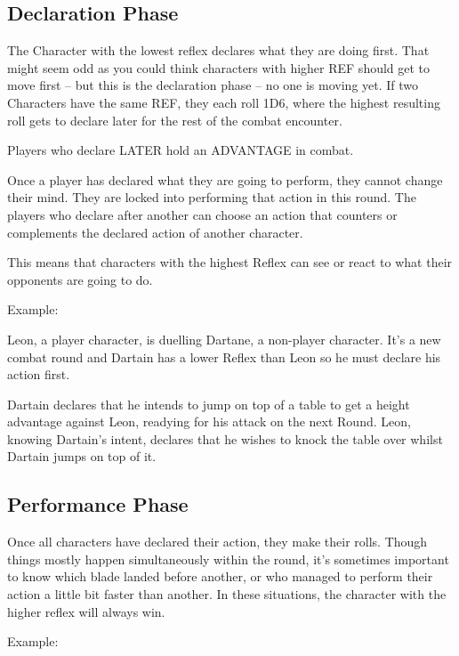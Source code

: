 \subsection{Declaration Phase} \label{subsec:declaration_phase}

The Character with the lowest reflex declares what they are doing first. That might seem odd as you could think characters with higher REF should get to move first – but this is the declaration phase – no one is moving yet. If two Characters have the same REF, they each roll 1D6, where the highest resulting roll gets to declare later for the rest of the combat encounter.

Players who declare LATER hold an ADVANTAGE in combat.

Once a player has declared what they are going to perform, they cannot change their mind. They are locked into performing that action in this round. The players who declare after another can choose an action that counters or complements the declared action of another character.

This means that characters with the highest Reflex can see or react to what their opponents are going to do.

Example:

\begin{displayquote}
    Leon, a player character, is duelling Dartane, a non-player character. It's a new combat round and Dartain has a lower Reflex than Leon so he must declare his action first.

    Dartain declares that he intends to jump on top of a table to get a height advantage against Leon, readying for his attack on the next Round. Leon, knowing Dartain's intent, declares that he wishes to knock the table over whilst Dartain jumps on top of it.
\end{displayquote}

\subsection{Performance Phase} \label{subsec:performance_phase}

Once all characters have declared their action, they make their rolls. Though things mostly happen simultaneously within the round, it’s sometimes important to know which blade landed before another, or who managed to perform their action a little bit faster than another. In these situations, the character with the higher reflex will always win.

Example:


